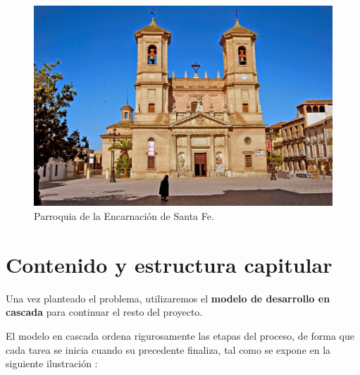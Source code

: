 \begin{figure}[H]
\noindent \begin{centering}
\includegraphics[width=\linewidth]{capitulo1/figura11}
\par\end{centering}
\smallskip
\caption[Parroquia de la Encarnación de Santa Fe.]{\label{fig:figura11} Parroquia de la Encarnación de Santa Fe. \cite{iglesias_granada}}
\end{figure}

\newpage

\section{Contenido y estructura capitular}

Una vez planteado el problema, utilizaremos el \textbf{modelo de desarrollo en cascada} para continuar el resto del proyecto.

El modelo en cascada ordena rigurosamente las etapas del proceso, de forma que cada tarea se inicia cuando su precedente finaliza, tal como se expone en la siguiente ilustración \cite{wiki_cascada}:

\smallskip

